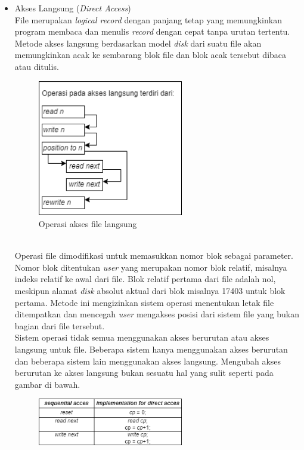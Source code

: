\documentclass[12pt]{article}
\begin{document}
\begin{itemize}
    \item Akses Langsung (\textit{Direct Access})
        \\File merupakan \textit{logical record} dengan panjang tetap yang memungkinkan program membaca dan menulis \textit{record} dengan cepat tanpa urutan tertentu. Metode akses langsung berdasarkan model \textit{disk} dari suatu file akan memungkinkan acak ke sembarang blok file dan blok acak tersebut dibaca atau ditulis.
        \begin{figure}[h]
			\centering
			\includegraphics[width=0.6\textwidth]{asset/gambar3.png}
            \caption{Operasi akses file langsung}
        \end{figure}
        \\Operasi file dimodifikasi untuk memasukkan nomor blok sebagai parameter. Nomor blok ditentukan \textit{user} yang merupakan nomor blok relatif, misalnya indeks relatif ke awal dari file. Blok relatif pertama dari file adalah nol, meskipun alamat \textit{disk} absolut aktual dari blok misalnya 17403 untuk blok pertama. Metode ini mengizinkan sistem operasi menentukan letak file ditempatkan dan mencegah \textit{user} mengakses posisi dari sistem file yang bukan bagian dari file tersebut. 
        \\Sistem operasi tidak semua menggunakan akses berurutan atau akses langsung untuk file. Beberapa sistem hanya menggunakan akses berurutan dan beberapa sistem lain menggunakan akses langsung. Mengubah akses berurutan ke akses langsung bukan sesuatu hal yang sulit seperti pada gambar di bawah.
        \begin{figure}[h]
			\centering
			\includegraphics[width=0.6\textwidth]{asset/gambar4.png}

\end{figure}
\end{itemize}
\end{document}

